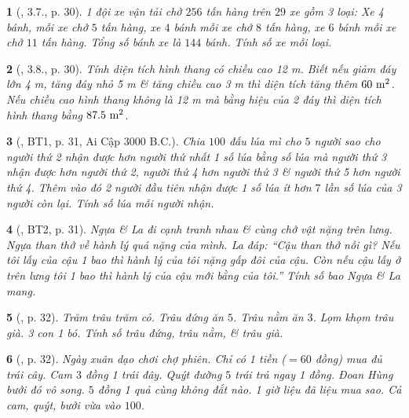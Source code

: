 \documentclass{article}
\newtheorem{baitoan}{}
\begin{document}
\begin{baitoan}[\cite{Binh_boi_duong_Toan_9_tap_2}, 3.7., p. 30]
	1 đội xe vận tải chở $256$ tấn hàng trên $29$ xe gồm 3 loại: Xe 4 bánh, mỗi xe chở $5$ tấn hàng, xe $4$ bánh mỗi xe chở $8$ tấn hàng, xe $6$ bánh mỗi xe chở $11$ tấn hàng. Tổng số bánh xe là $144$ bánh. Tính số xe mỗi loại.
\end{baitoan}

\begin{baitoan}[\cite{Binh_boi_duong_Toan_9_tap_2}, 3.8., p. 30]
	Tính diện tích hình thang có chiều cao {\rm12 m}. Biết nếu giảm đáy lớn {\rm4 m}, tăng đáy nhỏ {\rm5 m} \& tăng chiều cao {\rm3 m} thì diện tích tăng thêm $\rm60\ m^2$. Nếu chiều cao hình thang không là {\rm12 m} mà bằng hiệu của 2 đáy thì diện tích hình thang bằng $\rm87.5\ m^2$.
\end{baitoan}

\begin{baitoan}[\cite{Binh_boi_duong_Toan_9_tap_2}, BT1, p. 31, Ai Cập 3000 B.C.]
	Chia $100$ đấu lúa mì cho $5$ người sao cho người thứ 2 nhận được hơn người thứ nhất 1 số lúa bằng số lúa mà người thứ 3 nhận được hơn người thứ 2, người thứ 4 hơn người thứ 3 \& người thứ 5 hơn người thứ 4. Thêm vào đó 2 người đầu tiên nhận được 1 số lúa ít hơn $7$ lần số lúa của 3 người còn lại. Tính số lúa mỗi người nhận.
\end{baitoan}

\begin{baitoan}[\cite{Binh_boi_duong_Toan_9_tap_2}, BT2, p. 31]
	Ngựa \& La đi cạnh tranh nhau \& cùng chở vật nặng trên lưng. Ngựa than thở về hành lý quá nặng của mình. La đáp: ``Cậu than thở nỗi gì? Nếu tôi lấy của cậu 1 bao thì hành lý của tôi nặng gấp đôi của cậu. Còn nếu cậu lấy ở trên lưng tôi 1 bao thì hành lý của cậu mới bằng của tôi.'' Tính số bao Ngựa \& La mang.
\end{baitoan}

\begin{baitoan}[\cite{Binh_boi_duong_Toan_9_tap_2}, p. 32]
	Trăm trâu trăm cỏ. Trâu đứng ăn $5$. Trâu nằm ăn $3$. Lọm khọm trâu già. 3 con 1 bó. Tính số trâu đứng, trâu nằm, \& trâu già.
\end{baitoan}

\begin{baitoan}[\cite{Binh_boi_duong_Toan_9_tap_2}, p. 32]
	Ngày xuân dạo chơi chợ phiên. Chỉ có 1 tiền ($= 60$ đồng) mua đủ trái cây. Cam $3$ đồng 1 trái đây. Quýt đường $5$ trái trả ngay 1 đồng. Đoan Hùng bưởi đó vô song. $5$ đồng 1 quả cùng không đắt nào. 1 giờ liệu đã liệu mua sao. Cả cam, quýt, bưởi vừa vào $100$.
\end{baitoan}
\end{document}
